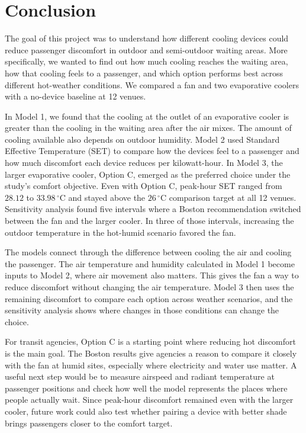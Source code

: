 \section{Conclusion}

\indent The goal of this project was to understand how different cooling devices could reduce passenger discomfort in outdoor and semi-outdoor waiting areas. More specifically, we wanted to find out how much cooling reaches the waiting area, how that cooling feels to a passenger, and which option performs best across different hot-weather conditions. We compared a fan and two evaporative coolers with a no-device baseline at 12 venues.

\indent In Model 1, we found that the cooling at the outlet of an evaporative cooler is greater than the cooling in the waiting area after the air mixes. The amount of cooling available also depends on outdoor humidity. Model 2 used Standard Effective Temperature (SET) to compare how the devices feel to a passenger and how much discomfort each device reduces per kilowatt-hour. In Model 3, the larger evaporative cooler, Option C, emerged as the preferred choice under the study's comfort objective. Even with Option C, peak-hour SET ranged from $28.12$ to $33.98\,^\circ\mathrm{C}$ and stayed above the $26\,^\circ\mathrm{C}$ comparison target at all 12 venues. Sensitivity analysis found five intervals where a Boston recommendation switched between the fan and the larger cooler. In three of those intervals, increasing the outdoor temperature in the hot-humid scenario favored the fan.

\indent The models connect through the difference between cooling the air and cooling the passenger. The air temperature and humidity calculated in Model 1 become inputs to Model 2, where air movement also matters. This gives the fan a way to reduce discomfort without changing the air temperature. Model 3 then uses the remaining discomfort to compare each option across weather scenarios, and the sensitivity analysis shows where changes in those conditions can change the choice.

\indent For transit agencies, Option C is a starting point where reducing hot discomfort is the main goal. The Boston results give agencies a reason to compare it closely with the fan at humid sites, especially where electricity and water use matter. A useful next step would be to measure airspeed and radiant temperature at passenger positions and check how well the model represents the places where people actually wait. Since peak-hour discomfort remained even with the larger cooler, future work could also test whether pairing a device with better shade brings passengers closer to the comfort target.